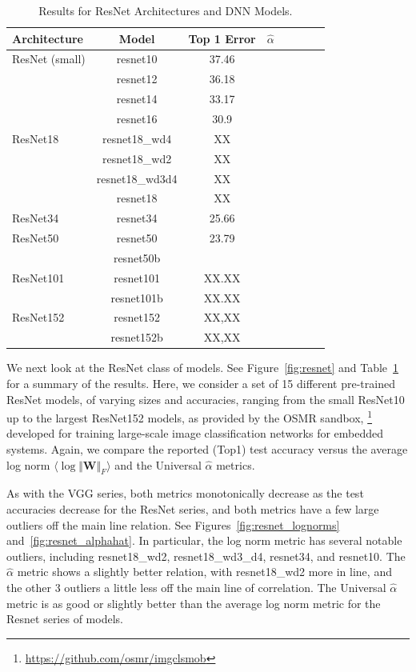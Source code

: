 \begin{table}[t] %
\small
\begin{center}
\begin{tabular}{|p{0.75in}|c|c|c|c|c|c|c|}
\hline
Architecture 
 & Model
 & Top 1 Error & $\hat{\alpha}$ \\
\hline
ResNet (small)  & resnet10 & 37.46 & \\
& resnet12 & 36.18 & \\
& resnet14 & 33.17 & \\
& resnet16 & 30.9 & \\
\hline
ResNet18 & resnet18\_wd4 & XX & \\
& resnet18\_wd2 & XX & \\
& resnet18\_wd3d4& XX & \\
& resnet18 & XX & \\

\hline
ResNet34 & resnet34 & 25.66 & \\
\hline
ResNet50 & resnet50 & 23.79 & \\
& resnet50b &  & \\

\hline
ResNet101 & resnet101 & XX.XX & \\
& resnet101b & XX.XX & \\
\hline
ResNet152 & resnet152 & XX,XX & \\
& resnet152b & XX,XX & \\
\hline
\end{tabular}
\end{center}
\caption{Results for ResNet Architectures and DNN Models.
        }
\label{table:models_resnet}
\end{table}

We next look at the ResNet class of models. 
See Figure~\ref{fig:resnet} and Table~\ref{table:models_resnet} for a summary of the results.
Here, we consider a set of 15 different pre-trained ResNet models, of varying sizes and accuracies, ranging from the small ResNet10 up to the largest ResNet152 models, as provided by the OSMR sandbox,%
\footnote{\url{https://github.com/osmr/imgclsmob}}
developed for training large-scale image classification networks for embedded systems.
Again, we compare the reported (Top1) test accuracy versus the average log norm $\langle\log\Vert\mathbf{W}\Vert_{F}\rangle$ and the Universal $\hat{\alpha}$ metrics. 

As with the VGG series, both metrics monotonically decrease as the test accuracies decrease for the ResNet series, and both metrics have a few large outliers off the main line relation. 
See Figures~\ref{fig:resnet_lognorms} and~\ref{fig:resnet_alphahat}.
In particular, the log norm metric has several notable outliers, including resnet18\_wd2, resnet18\_wd3\_d4, resnet34, and resnet10. 
The $\hat{\alpha}$ metric shows a slightly better relation, with resnet18\_wd2 more in line, and the other 3 outliers a little less off the main line of correlation. 
The Universal $\hat{\alpha}$ metric is as good or slightly better than the average log norm metric for the Resnet series of models. 

